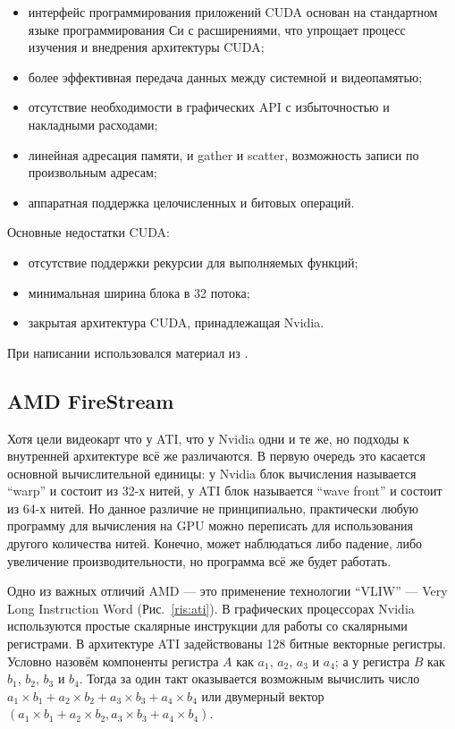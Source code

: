 \begin{itemize}
  \item{интерфейс программирования приложений CUDA основан на стандартном языке программирования Си с расширениями, что упрощает процесс изучения и внедрения архитектуры CUDA;}
\item{более эффективная передача данных между системной и видеопамятью;}
\item{отсутствие необходимости в графических API с избыточностью и накладными расходами;}
\item{линейная адресация памяти, и gather и scatter, возможность записи по произвольным адресам;}
\item{аппаратная поддержка целочисленных и битовых операций.}
\end{itemize}

Основные недостатки CUDA:

\begin{itemize}
\item{отсутствие поддержки рекурсии для выполняемых функций;}
\item{минимальная ширина блока в 32 потока;}
\item{закрытая архитектура CUDA, принадлежащая Nvidia.}
\end{itemize}

При написании использовался материал из \cite{nvidiacuda}.

\subsection{AMD FireStream}

Хотя цели видеокарт что у ATI, что у Nvidia одни и те же, но подходы к внутренней архитектуре всё же различаются. В первую очередь это касается основной вычислительной единицы: у Nvidia блок вычисления называется ``warp'' и состоит из 32-х нитей, у ATI блок называется ``wave front'' и состоит из 64-х нитей. Но данное различие не принципиально, практически любую программу для вычисления на GPU можно переписать для использования другого количества нитей. Конечно, может наблюдаться либо падение, либо увеличение производительности, но программа всё же будет работать.

Одно из важных отличий AMD --- это применение технологии ``VLIW'' --- Very Long Instruction Word (Рис.~\ref{ris:ati}). В графических процессорах Nvidia используются простые скалярные инструкции для работы со скалярными регистрами. В архитектуре ATI задействованы 128 битные векторные регистры. Условно назовём компоненты регистра $A$ как $a_1$, $a_2$, $a_3$ и $a_4$; а у регистра $B$ как $b_1$, $b_2$, $b_3$ и $b_4$. Тогда за один такт оказывается возможным вычислить число $a_1 \times b_1 + a_2 \times b_2 + a_3 \times b_3 + a_4 \times b_4$ или двумерный вектор $(a_1 \times b_1 + a_2 \times b_2, a_3 \times b_3 + a_4 \times b_4)$.

